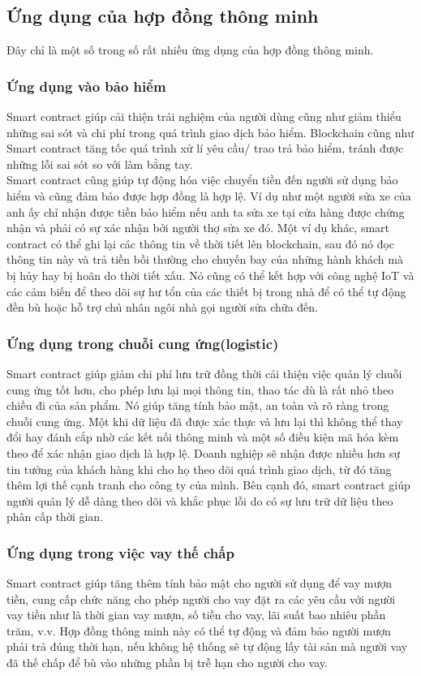 \documentclass[a4paper]{article}
\begin{document}
\subsection{Ứng dụng của hợp đồng thông minh}
Đây chỉ là một số trong số rất nhiều ứng dụng của hợp đồng thông minh.
\subsubsection{Ứng dụng vào bảo hiểm}
Smart contract giúp cải thiện trải nghiệm của người dùng cũng như giảm thiểu những sai sót và chi phí trong quá trình giao dịch bảo hiểm. Blockchain cũng như Smart contract tăng tốc quá trình xử lí yêu cầu/ trao trả bảo hiểm, tránh được những lỗi sai sót so với làm bằng tay.\\

Smart contract cũng giúp tự động hóa việc chuyển tiền đến người sử dụng bảo hiểm và cũng đảm bảo được hợp đồng là hợp lệ. Ví dụ như một người sửa xe của anh ấy chỉ nhận được tiền bảo hiểm nếu anh ta sửa xe tại cửa hàng được chứng nhận và phải có sự xác nhận bởi người thợ sửa xe đó. Một ví dụ khác, smart contract có thể ghi lại các thông tin về thời tiết lên blockchain, sau đó nó đọc thông tin này và trả tiền bồi thường cho chuyến bay của những hành khách mà bị hủy hay bị hoãn do thời tiết xấu. Nó cũng có thể kết hợp với công nghệ IoT và các cảm biến để theo dõi sự hư tổn của các thiết bị trong nhà để có thể tự động đền bù hoặc hỗ trợ chủ nhân ngôi nhà gọi người sửa chữa đến.

\subsubsection{Ứng dụng trong chuỗi cung ứng(logistic)}

Smart contract giúp giảm chi phí lưu trữ đồng thời cải thiện việc quản lý chuỗi cung ứng tốt hơn, cho phép lưu lại mọi thông tin, thao tác dù là rất nhỏ theo chiều đi của sản phẩm. Nó giúp tăng tính bảo mật, an toàn và rõ ràng trong chuỗi cung ứng. Một khi dữ liệu đã được xác thực và lưu lại thì không thể thay đổi hay đánh cắp nhờ các kết nối thông minh và một số điều kiện mã hóa kèm theo để xác nhận giao dịch là hợp lệ. Doanh nghiệp sẽ nhận được nhiều hơn sự tin tưởng của khách hàng khi cho họ theo dõi quá trình giao dịch, từ đó tăng thêm lợi thế cạnh tranh cho công ty của mình. Bên cạnh đó, smart contract giúp người quản lý dễ dàng theo dõi và khắc phục lỗi do có sự lưu trữ dữ liệu theo phân cấp thời gian.

\subsubsection{Ứng dụng trong việc vay thế chấp}
Smart contract giúp tăng thêm tính bảo mật cho người sử dụng để vay mượn tiền, cung cấp chức năng cho phép người cho vay đặt ra các yêu cầu với người vay tiền như là thời gian vay mượn, số tiền cho vay, lãi suất bao nhiêu phần trăm, v.v. Hợp đồng thông minh này có thể tự động và đảm bảo người mượn phải trả đúng thời hạn, nếu không hệ thống sẽ tự động lấy tài sản mà người vay đã thế chấp để bù vào những phần bị trễ hạn cho người cho vay.
\end{document}
